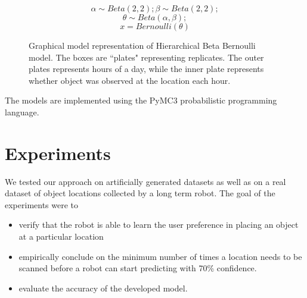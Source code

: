\noindent
\begin{figure}[htp]

\begin{minipage}{0.3\textwidth}
\centering


\end{minipage}%
\begin{minipage}{0.7\textwidth}

\begin{equation*}
	\alpha \sim Beta (2,2) ; \beta \sim Beta (2, 2);
\end{equation*}
\begin{equation*}
	\theta \sim Beta (\alpha, \beta);
\end{equation*}
\begin{equation*}
	x = Bernoulli (\theta)
\end{equation*}
\end{minipage}
\caption[Hierarchical Beta Bernoulli graphical model]{Graphical model representation of Hierarchical Beta Bernoulli model. The boxes are ``plates" representing replicates. The outer plates represents hours of a day, while the inner plate represents whether object was observed at the location each hour.}
\label{bbm}
\end{figure}

The models are implemented using the PyMC3 probabilistic programming language.

\FloatBarrier
\section{Experiments}

We tested our approach on artificially generated datasets as well as on a real dataset of object locations collected by a long term robot.
The goal of the experiments were to
\begin{itemize}
    \item verify that the robot is able to learn the user preference in placing an object at a particular location
	\item empirically conclude on the minimum number of times a location needs to be scanned before a robot can start predicting with 70\% confidence.
	\item evaluate the accuracy of the developed model.
\end{itemize}

